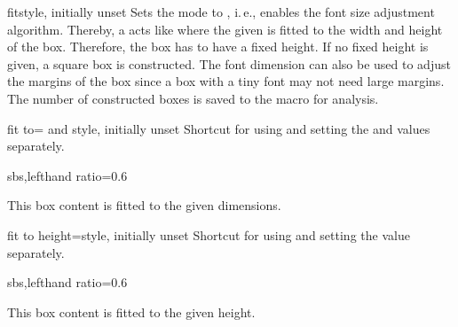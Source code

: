 \enlargethispage*{5mm}
\begin{docTcbKey}{fit}{}{style, initially unset}
  Sets the  mode to , i.\,e., enables the
  font size adjustment algorithm. Thereby, a  acts
  like  where the given  is fitted to
  the width and height of the box. Therefore, the box has to have a fixed height.
  If no fixed height is given, a square box is constructed.
  The font dimension  can also be used to adjust
  the margins of the box since a box with a tiny font may not need large
  margins. The number of constructed boxes is saved to the macro 
  for analysis.

\end{docTcbKey}


\clearpage
\begin{docTcbKey}{fit to}{= and }{style, initially unset}
  Shortcut for using  and setting the  and  values
  separately.
\begin{dispExample*}{sbs,lefthand ratio=0.6}

\begin{tcolorbox}[fit to=3cm and 2cm]
  This box content is fitted to the given
  dimensions.
\end{tcolorbox}
\end{dispExample*}
\end{docTcbKey}


\begin{docTcbKey}{fit to height}{=}{style, initially unset}
  Shortcut for using  and setting the  value separately.
\begin{dispExample*}{sbs,lefthand ratio=0.6}

\begin{tcolorbox}[fit to height=2cm]
  This box content is fitted to the given
  height.
\end{tcolorbox}
\end{dispExample*}
\end{docTcbKey}

